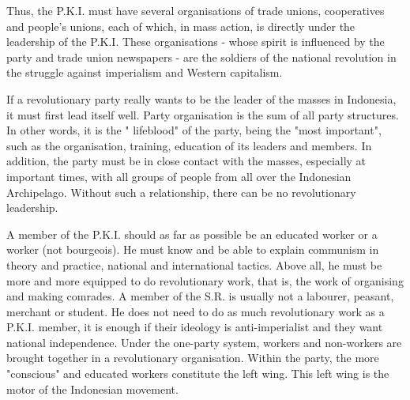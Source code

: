 Thus, the P.K.I. must have several organisations of trade unions, cooperatives and people's unions, each of which, in mass action, 
is directly under the leadership of the P.K.I. These organisations - whose spirit is influenced by the party and trade union newspapers - 
are the soldiers of the national revolution in the struggle against imperialism and Western capitalism.\nline

If a revolutionary party really wants to be the leader of the masses in Indonesia, it must first lead itself well. 
Party organisation is the sum of all party structures. In other words, it is the " lifeblood" of the party, being the "most important", 
such as the organisation, training, education of its leaders and members. In addition, the party must be in close contact with the masses, 
especially at important times, with all groups of people from all over the Indonesian Archipelago. Without such a relationship, 
there can be no revolutionary leadership.\nline

A member of the P.K.I. should as far as possible be an educated worker or a worker (not bourgeois). 
He must know and be able to explain communism in theory and practice, national and international tactics. 
Above all, he must be more and more equipped to do revolutionary work, that is, the work of organising and making comrades. 
A member of the S.R. is usually not a labourer, peasant, merchant or student. He does not need to do as much revolutionary work as a 
P.K.I. member, it is enough if their ideology is anti-imperialist and they want national independence. Under the one-party system, 
workers and non-workers are brought together in a revolutionary organisation. Within the party, the more "conscious" and educated workers 
constitute the left wing. This left wing is the motor of the Indonesian movement.\nline